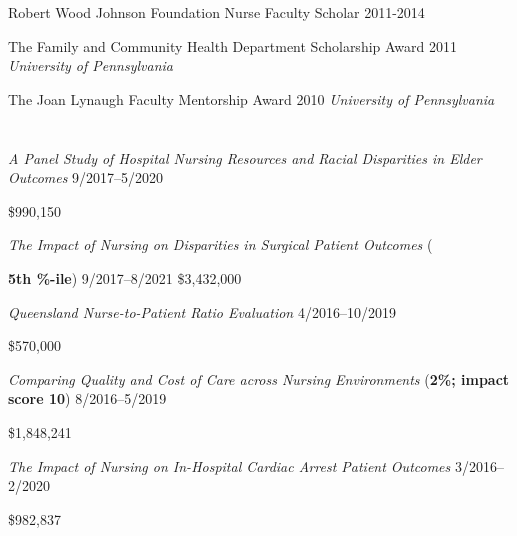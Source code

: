 \documentclass[10pt,]{article}
\begin{document}
{{{{{{Robert Wood Johnson Foundation Nurse Faculty Scholar \hfill 2011-2014	

The Family and Community Health Department Scholarship Award \hfill 2011 \newline
\hspace*{0.5cm} {\textit {University of Pennsylvania}}

The Joan Lynaugh Faculty Mentorship Award \hfill 2010 \newline
\hspace*{0.5cm} {\textit {University of Pennsylvania}}

\section{\Large {}} 


\textit {A Panel Study of Hospital Nursing Resources and Racial Disparities in Elder Outcomes} \hfill  9/2017--5/2020 \newline
{ \hfill \$990,150 

\textit {The Impact of Nursing on Disparities in Surgical Patient Outcomes} ({\textbf{5{\small{th} {\small{\%-ile}}}}) \hfill 9/2017--8/2021 \newline
{}	\hfill \$3,432,000

\textit {Queensland Nurse-to-Patient Ratio Evaluation} \hfill  4/2016--10/2019 \newline
{ \hfill \$570,000

\textit {Comparing Quality and Cost of Care across Nursing Environments} ({\textbf{2{\small{\%}}; impact score 10}}) \hfill 8/2016--5/2019 \newline
{	\hfill \$1,848,241

\textit {The Impact of Nursing on In-Hospital Cardiac Arrest Patient Outcomes} \hfill  3/2016--2/2020 \newline
{ \hfill \$982,837

}}}}}}}}}}}
\end{document}
